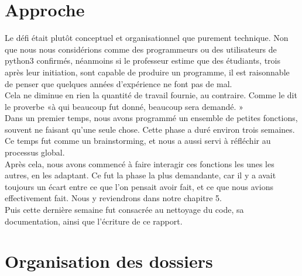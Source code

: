 \section{Approche}

Le défi était plutôt conceptuel et organisationnel que purement technique. Non que nous nous considérions comme des programmeurs ou des utilisateurs de python3 confirmés, néanmoins si le professeur estime que des étudiants, trois après leur initiation, sont capable de produire un programme, il est raisonnable de penser que quelques années d'expérience ne font pas de mal. \\

Cela ne diminue en rien la quantité de travail fournie, au contraire. Comme le dit le proverbe «à qui beaucoup fut donné, beaucoup sera demandé. » \\

Dans un premier temps, nous avons programmé un ensemble de petites fonctions, souvent ne faisant qu'une seule chose. Cette phase a duré environ trois semaines. Ce temps fut comme un brainstorming, et nous a aussi servi à réfléchir au processus global.\\

Après cela, nous avons commencé à faire interagir ces fonctions les unes les autres, en les adaptant. Ce fut la phase la plus demandante, car il y a avait toujours un écart entre ce que l'on pensait avoir fait, et ce que nous avions effectivement fait. Nous y reviendrons dans notre chapitre 5. \\

Puis cette dernière semaine fut consacrée au nettoyage du code, sa documentation, ainsi que l'écriture de ce rapport. \\

\newpage
\section{Organisation des dossiers}

